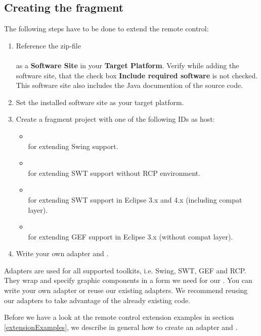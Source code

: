 \subsection{Creating the fragment}

The following steps have to be done to extend the remote control:

\begin{enumerate}
  \item Reference the zip-file\\
        \\
        as a \textbf{Software Site} in your \textbf{Target Platform}.
        Verify while adding the software site, that the check box
        \textbf{Include required software} is not checked. This software site also
        includes  the Java documention of the source code.
  \item Set the installed software site as your target platform.
  \item Create a fragment project with one of the following IDs as host:
    \begin{itemize}
      \item {}\\
            for extending Swing support.
      \item {}\\
            for extending SWT support without RCP environment.
      \item {}\\
            for extending SWT support in Eclipse 3.x and 4.x (including compat
            layer).
      \item {}\\
            for extending GEF support in Eclipse 3.x (without compat
            layer).
   \end{itemize}
  \item Write your own adapter and \gdtesterclasses.
\end{enumerate}

Adapters are used for all supported toolkits, i.e. Swing, SWT, GEF and RCP.
They wrap and specify graphic components in a form we need for our
\gdtesterclasses. You can write your own adapter or reuse our existing
adapters. We recommend reusing our adapters to take advantage of the already
existing code.

Before we have a look at the remote control extension examples in section
\ref{extensionExamples}, we describe in general how to create an
adapter and \gdtesterclasses.


